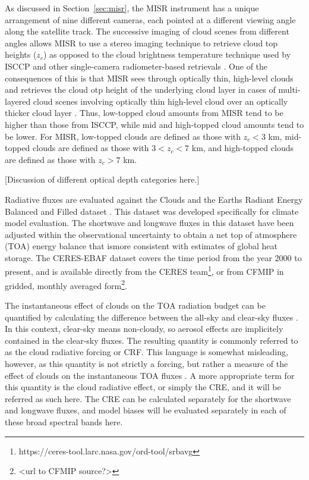 As discussed in Section~\ref{sec:misr}, the MISR instrument has a unique
arrangement of nine different cameras, each pointed at a different
viewing angle along the satellite track. The successive imaging of cloud
scenes from different angles allows MISR to use a stereo imaging
technique to retrieve cloud top heights (\(z_c\)) as opposed to the
cloud brightness temperature technique used by ISCCP and other
single-camera radiometer-based retrievals
\citep{moroney_et_al_2002, muller_et_al_2002}. One of the consequences
of this is that MISR sees through optically thin, high-level clouds and
retrieves the cloud otp height of the underlying cloud layer in cases of
multi-layered cloud scenes involving optically thin high-level cloud
over an optically thicker cloud layer \citep{marchand_et_al_2010}. Thus,
low-topped cloud amounts from MISR tend to be higher than those from
ISCCP, while mid and high-topped cloud amounts tend to be lower. For
MISR, low-topped clouds are defined as those with \(z_c < 3\) km,
mid-topped clouds are defined as those with \(3 < z_c < 7\) km, and
high-topped clouds are defined as those with \(z_c > 7\) km.

{[}Discussion of different optical depth categories here.{]}

Radiative fluxes are evaluated against the Clouds and the Earths Radiant
Energy Balanced and Filled dataset \citep[CERES-EBAF Version
2.6;][]{loeb_et_al_2009}. This dataset was developed specifically for
climate model evaluation. The shortwave and longwave fluxes in this
dataset have been adjusted within the observational uncertainty to
obtain a net top of atmosphere (TOA) energy balance that ismore
consistent with estimates of global heat storage. The CERES-EBAF dataset
covers the time period from the year 2000 to present, and is available
directly from the CERES team\footnote{https://ceres-tool.larc.nasa.gov/ord-tool/srbavg},
or from CFMIP in gridded, monthly averaged form\footnote{\textless{}url
  to CFMIP source?\textgreater{}}.

The instantaneous effect of clouds on the TOA radiation budget can be
quantified by calculating the difference between the all-sky and
clear-sky fluxes
\citep[e.g.,][]{ellis_and_vonderhaar_1976, ramanathan_1987, ramanathan_et_al_1989}.
In this context, clear-sky means non-cloudy, so aerosol effects are
implicitely contained in the clear-sky fluxes. The resulting quantity is
commonly referred to as the cloud radiative forcing or CRF. This
language is somewhat misleading, however, as this quantity is not
strictly a forcing, but rather a measure of the effect of clouds on the
instantaneous TOA fluxes \citep{stephens_2005}. A more appropriate term
for this quantity is the cloud radiative effect, or simply the CRE, and
it will be referred as such here. The CRE can be calculated separately
for the shortwave and longwave fluxes, and model biases will be
evaluated separately in each of these broad spectral bands here.

